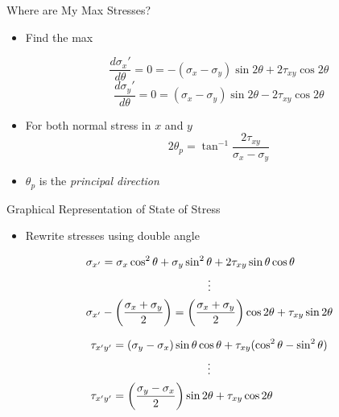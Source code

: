 \documentclass[10pt, svgnames]{beamer}
\begin{document}
\begin{frame}[label={sec:org4073d44}]{Where are My Max Stresses?}
\begin{itemize}
\item Find the max

\[\dfrac{d \sigma_x'}{d\theta} = 0 = - \left( \sigma_x - \sigma_y \right) \sin 2\theta + 2\tau_{xy} \cos 2\theta\]
\[\dfrac{d \sigma_y'}{d\theta} = 0 = \left( \sigma_x - \sigma_y \right) \sin 2\theta - 2\tau_{xy} \cos 2\theta\]

\item For both normal stress in \(x\) and \(y\)
\[2 \theta_p = \tan^{-1} \dfrac{2\tau_{xy}}{\sigma_x - \sigma_y}\]

\item \(\theta_p\) is the \emph{principal direction}
\end{itemize}
\end{frame}

\begin{frame}[label={sec:org3e262d1}]{Graphical Representation of State of Stress}
\begin{itemize}
\item Rewrite stresses using double angle
\end{itemize}

\begin{gather*}
  \sigma_{x'} = \sigma_x\cos^2\theta  + \sigma_y\sin^2\theta  + 2\tau_{xy}\sin \theta \cos \theta  \hfill \\
  \vdots \\
  \sigma_{x'} - \left( \dfrac{\sigma_x + \sigma_y}{2} \right) = \left( \dfrac{\sigma_x + \sigma_y}{2} \right)\cos 2\theta  + {\tau_{xy}}\sin 2\theta  \hfill
\end{gather*}

\begin{gather*}
  \tau_{x'y'} = (\sigma_y - \sigma_x)\sin \theta \cos \theta  + \tau_{xy}(\cos^2\theta  - \sin^2\theta ) \\
  \vdots \\
  \tau_{x'y'} = \left( \dfrac{\sigma_y - \sigma_x}{2} \right)\sin 2\theta  + \tau _{xy}\cos 2\theta \hfill
\end{gather*}
\end{frame}
\end{document}
